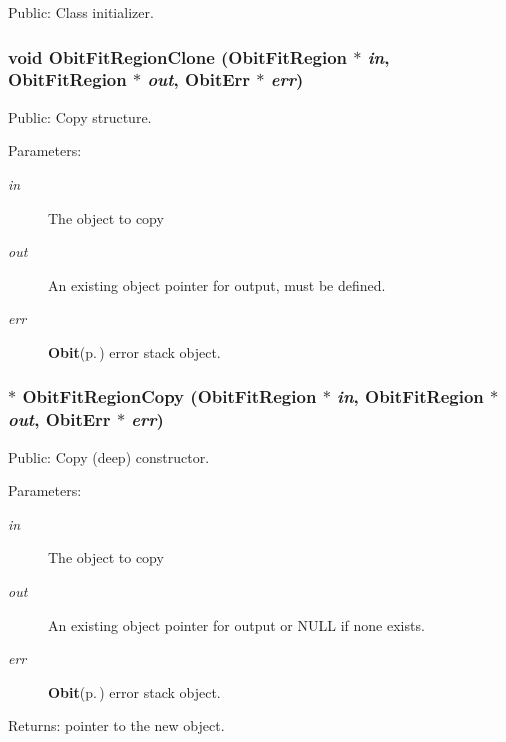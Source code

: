 Public: Class initializer. 

\subsubsection{\setlength{\rightskip}{0pt plus 5cm}void Obit\-Fit\-Region\-Clone ({\bf Obit\-Fit\-Region} $\ast$ {\em in}, {\bf Obit\-Fit\-Region} $\ast$ {\em out}, {\bf Obit\-Err} $\ast$ {\em err})}\label{ObitFitRegion_8h_a10}


Public: Copy structure. 

\begin{Desc}
\item[Parameters:]
\begin{description}
\item[{\em in}]The object to copy \item[{\em out}]An existing object pointer for output, must be defined. \item[{\em err}]{\bf Obit}{\rm (p.\,\pageref{structObit})} error stack object. \end{description}
\end{Desc}
\subsubsection{$\ast$ Obit\-Fit\-Region\-Copy ({\bf Obit\-Fit\-Region} $\ast$ {\em in}, {\bf Obit\-Fit\-Region} $\ast$ {\em out}, {\bf Obit\-Err} $\ast$ {\em err})}\label{ObitFitRegion_8h_a9}


Public: Copy (deep) constructor. 

\begin{Desc}
\item[Parameters:]
\begin{description}
\item[{\em in}]The object to copy \item[{\em out}]An existing object pointer for output or NULL if none exists. \item[{\em err}]{\bf Obit}{\rm (p.\,\pageref{structObit})} error stack object. \end{description}
\end{Desc}
\begin{Desc}
\item[Returns:]pointer to the new object. \end{Desc}
